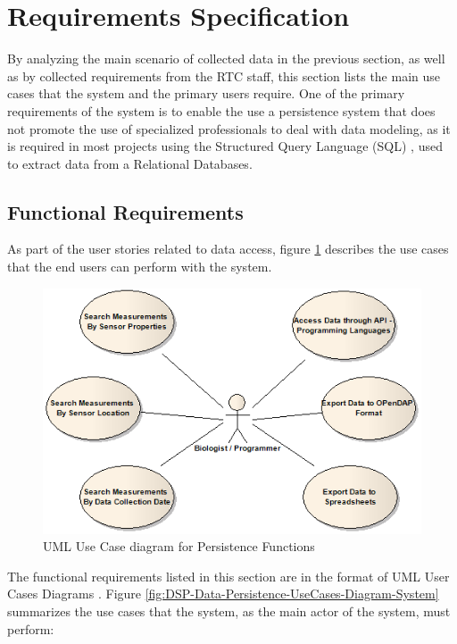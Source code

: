 \section{Requirements Specification}

By analyzing the main scenario of collected data in the previous section, as
well as by collected requirements from the RTC staff, this section lists the
main use cases that the system and the primary users require. One of the
primary requirements of the system is to enable the use a persistence system
that does not promote the use of specialized professionals to deal with data
modeling, as it is required in most projects using the Structured Query
Language (SQL) \cite{sql}, used to extract data from a Relational Databases.

\subsection{Functional Requirements}
As part of the user stories related to data access, figure
\ref{fig:DSP-Data-Persistence-UseCases-Diagram-Users} describes the use cases
that the end users can perform with the system.

\begin{figure}[!b]
  \centering
  \includegraphics[scale=0.5]{../diagrams/DSP-Data-Persistence-UseCases-Diagram-Users}
  \caption{UML Use Case diagram for Persistence Functions}
  \label{fig:DSP-Data-Persistence-UseCases-Diagram-Users}
\end{figure}

The functional requirements listed in this section are in the format of UML
User Cases Diagrams \cite{uml}. Figure
\ref{fig:DSP-Data-Persistence-UseCases-Diagram-System} summarizes the use
cases that the system, as the main actor of the system, must perform:

